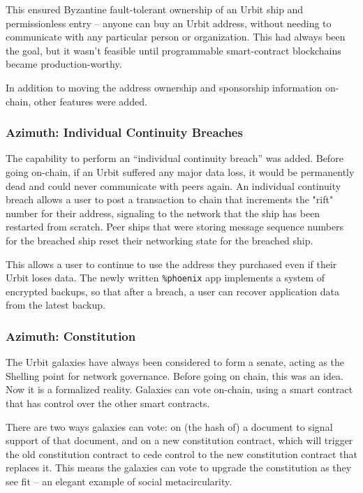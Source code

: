 \documentclass[twoside]{article}
\begin{document}
This ensured Byzantine fault-tolerant ownership of an Urbit ship and permissionless entry – anyone can buy an Urbit address, without needing to communicate with any particular person or organization.  This had always been the goal, but it wasn't feasible until programmable smart-contract blockchains became production-worthy.

In addition to moving the address ownership and sponsorship information on-chain, other features were added.

\subsubsection{Azimuth: Individual Continuity Breaches}

The capability to perform an ``individual continuity breach'' was added.  Before going on-chain, if an Urbit suffered any major data loss, it would be permanently dead and could never communicate with peers again.  An individual continuity breach allows a user to post a transaction to chain that increments the "rift" number for their address, signaling to the network that the ship has been restarted from scratch.  Peer ships that were storing message sequence numbers for the breached ship reset their networking state for the breached ship.

This allows a user to continue to use the address they purchased even if their Urbit loses data.  The newly written \lstinline[style=inlinecode]{%phoenix} app implements a system of encrypted backups, so that after a breach, a user can recover application data from the latest backup.

\subsubsection{Azimuth: Constitution}

The Urbit galaxies have always been considered to form a senate, acting as the Shelling point for network governance.  Before going on chain, this was an idea.  Now it is a formalized reality.  Galaxies can vote on-chain, using a smart contract that has control over the other smart contracts.

There are two ways galaxies can vote: on (the hash of) a document to signal support of that document, and on a new constitution contract, which will trigger the old constitution contract to cede control to the new constitution contract that replaces it.  This means the galaxies can vote to upgrade the constitution as they see fit – an elegant example of social metacircularity.
\end{document}
